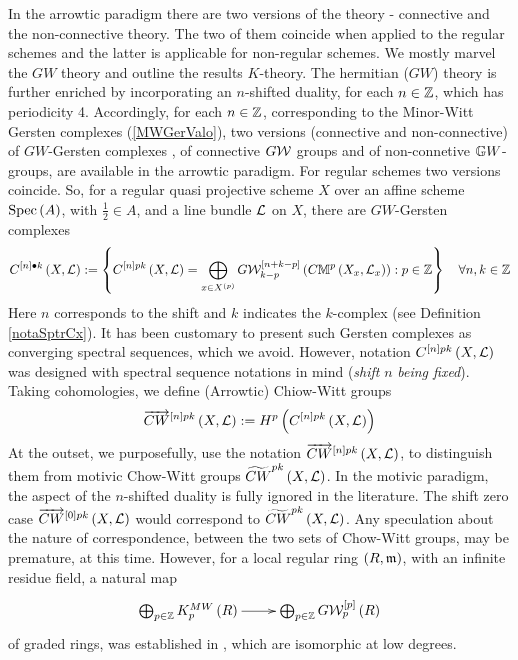 \documentclass[12pt]{article}
\begin{document}
 In the arrowtic paradigm there are two versions of the theory - connective and the non-connective theory.  The two of them coincide when applied to  the regular schemes and the latter is applicable for non-regular schemes. 
We mostly marvel the $GW$ theory and  outline the results $K$-theory. 
 The hermitian ($GW$) theory is further enriched by incorporating  an $n$-shifted duality,
 for each $n\in {\mathbb {Z}}$, which has periodicity 4. Accordingly, for each $n\in {\mathbb {Z}}$, 
  corresponding to the Minor-Witt Gersten complexes  (\ref{MWGerValo}),   two versions  (connective and non-connective) of $GW$-Gersten complexes \cite[pp 474]{M23}, of 
  connective $G{\mathcal{W}}$ groups and of non-connetive ${\mathbb{G}}W$-groups, 
 are available in the arrowtic paradigm. %
 For regular schemes two versions coincide. So, for a regular quasi projective scheme $X$ over an affine scheme $\mathrm{Spec}\left(A\right)$, with 
 $\frac{1}{2}\in A$, and a line bundle ${\mathcal{L}}$ on $X$, there are $GW$-Gersten complexes
 $$
 C^{\left[ n\right]{\bullet}k}\left( X, {\mathcal{L}}\right):=
 \left\{ 
 C^{\left[ n\right]pk}\left( X, {\mathcal{L}}\right)= \bigoplus_{x\in X^{\left( p\right)}}{G}{\mathcal{W}}_{k-p}^{\left[ n+k-p\right]}\left( C{\mathbb{M}}^{p}\left( X_x, {\mathcal{L}}_x\right)\right): p\in {\mathbb {Z}}
 \right\}\quad \forall n, k\in {\mathbb {Z}}
 $$
 Here $n$ corresponds to the shift and $k$ indicates the $k$-complex (see Definition \ref{notaSptrCx}). 
 It has been customary to present such Gersten complexes as converging spectral sequences, which we avoid.
 However, notation $C^{\left[ n\right]pk}\left( X, {\mathcal{L}}\right)$ was designed with spectral sequence notations in mind ({\it shift} $n$ {\it being fixed}).
 Taking cohomologies, we define 
 (Arrowtic) Chiow-Witt groups 
 $$
 \overrightarrow{CW}^{\left[ n\right]pk}\left( X, {\mathcal{L}}\right):= H^p\left(  C^{\left[ n\right]pk}\left( X, {\mathcal{L}}\right)\right)
 $$
 At the outset, we purposefully, use the notation $\overrightarrow{CW}^{\left[ n\right]pk}\left( X, {\mathcal{L}}\right)$, to distinguish them from motivic Chow-Witt groups  $\widetilde{CW}^{pk}\left( X, {\mathcal{L}}\right)$. 
In the motivic paradigm, the aspect of the  $n$-shifted duality is fully ignored in the literature. 
The shift zero case $\overrightarrow{CW}^{\left[ 0\right]pk}\left( X, {\mathcal{L}}\right)$  would correspond to $\widetilde{CW}^{pk}\left( X, {\mathcal{L}}\right)$.
Any speculation about the nature of correspondence, between the two sets of Chow-Witt groups,  may be premature, at this time. However, for a local 
regular ring $\left( R, \mathfrak {m}\right)$, with an infinite residue field, a natural map 
$$
\diagram 
\bigoplus_{p\in {\BZ}}K^{MW}_{p}\LRf{{R}} \ar[r] & \bigoplus_{p\in {\BZ}}G{\CW}_{p}^{\LRt{p}}\LRf{{R}}
\enddiagram 
$$
of graded rings, was established in \cite{AF17, SS25}, which are isomorphic at low degrees. 
\end{document}
